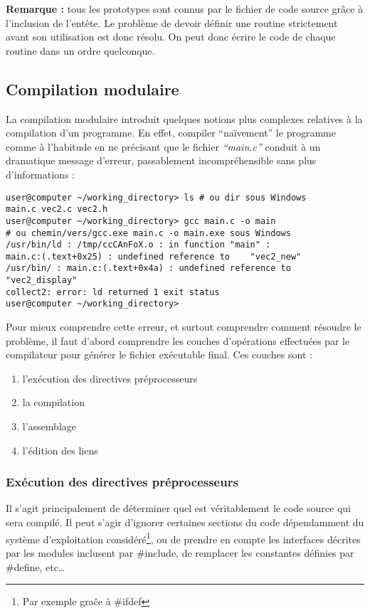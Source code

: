 \documentclass[../../../main.tex]{subfiles}
\begin{document}
\textbf{Remarque :} tous les prototypes sont connus par le fichier de code source grâce à l'inclusion de l'entête. Le problème de devoir définir une routine strictement avant son utilisation est donc résolu. On peut donc écrire le code de chaque routine dans un ordre quelconque.
\subsection{Compilation modulaire}
\label{sub:compilation_modulaire}
La compilation modulaire introduit quelques notions plus complexes relatives à la compilation d'un programme. En effet, compiler ``naïvement'' le programme comme à l'habitude en ne précisant que le fichier \textit{``main.c''} conduit à un dramatique message d'erreur, passablement incompréhensible sans plus d'informations :
\begin{verbatim}
user@computer ~/working_directory> ls # ou dir sous Windows
main.c vec2.c vec2.h
user@computer ~/working_directory> gcc main.c -o main
# ou chemin/vers/gcc.exe main.c -o main.exe sous Windows
/usr/bin/ld : /tmp/ccCAnFoX.o : in function "main" :
main.c:(.text+0x25) : undefined reference to	"vec2_new"
/usr/bin/ : main.c:(.text+0x4a) : undefined reference to "vec2_display"
collect2: error: ld returned 1 exit status
user@computer ~/working_directory>
\end{verbatim}
Pour mieux comprendre cette erreur, et surtout comprendre comment résoudre le problème, il faut d'abord comprendre les couches d'opérations effectuées par le compilateur pour générer le fichier exécutable final. Ces couches sont :
\begin{enumerate}
	\item l'exécution des directives préprocesseurs
	\item la compilation \cite{Aho}
	\item l'assemblage \cite{AL}
	\item l'édition des liens \cite{AL}\cite{LL}
\end{enumerate}
\subsubsection{Exécution des directives préprocesseurs}
\label{ssub:ex_cution_des_directives_pr_processeurs}
Il s'agit principalement de déterminer quel est véritablement le code source qui sera compilé. Il peut s'agir d'ignorer certaines sections du code dépendamment du système d'exploitation considéré\footnote{Par exemple graĉe à \#ifdef}, ou de prendre en compte les interfaces décrites par les modules inclusent par \textsf{\#include}, de remplacer les constantes définies par \textsf{\#define}, etc\dots
\end{document}
